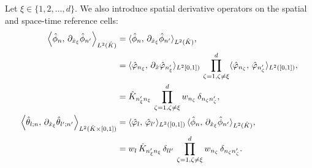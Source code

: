 \documentclass{scrreprt}
\theoremstyle{definition}
\theoremstyle{nonumberplain}
\newcommand{\cell}{K}
\newcommand{\refCell}{\hat{\cell}}
\begin{document}
Let $\xi\in\{1,2,\ldots,d\}$.
We also introduce spatial derivative operators on the spatial and
space-time reference cells:
\begin{align}
\label{eq:ader_impl:operators:stiffness_operator_3d}
\left\langle
\hat{\phi}_{n},\,
\partial_{\hat{x}_\xi}\hat{\phi}_{n'}
\right\rangle
_{L^2(\refCell)}
&=
\langle
\hat{\phi}_{n},\,\partial_{\hat{x}_{\xi}}\hat{\phi}_{n'}
\rangle_{L^2(\refCell)},\notag
\\
&=
\langle
\hat{\varphi}_{n_{\xi}},\,\partial_{\hat{x}}\hat{\varphi}_{n'_{\xi}}
\rangle_{L^2[0,1])}\notag
\,\prod_{\zeta=1,\zeta\neq\xi}^d
\langle \hat{\varphi}_{n_\zeta},\,\hat{\varphi}_{n'_\zeta}\rangle_{L^2([0,1])},
\notag
\\
&=
\refCell_{n_\xi'n_\xi }\,
\prod_{\zeta=1,\zeta\neq\xi}^d
w_{n_\zeta}\,
\delta_{n_\zeta n'_\zeta},
\\
\label{eq:ader_impl:operators:stiffness_operator_4d}
\left\langle
\hat{\theta}_{l;n},\,
\partial_{\hat{x}_\xi}\hat{\theta}_{l';n'}
\right\rangle
_{L^2(\refCell\times[0,1])}
&=
\langle
\hat{\varphi}_{l},\,\hat{\varphi}_{l'}
\rangle_{L^2([0,1])}
\,
\langle
\hat{\phi}_{n},\,\partial_{\hat{x}_{\xi}}\hat{\phi}_{n'}
\rangle_{L^2(\refCell)},\notag
\\
&=
w_{l}\,
\refCell_{n_\xi'n_\xi }\,
\delta_{ll'}\,
\prod_{\zeta=1,\zeta\neq\xi}^d
w_{n_\zeta}\,
\delta_{n_\zeta n'_\zeta}.
\end{align}
\end{document}

